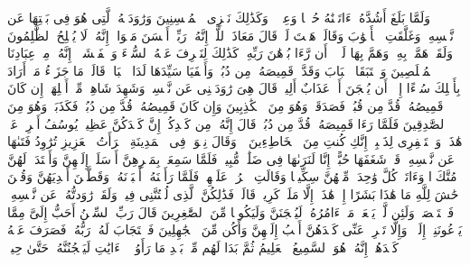 \stopbuffer%
\startbuffer[\q:12:22]
وَلَمَّا بَلَغَ أَشُدَّهُۥۤ ءَاتَیۡنَٰهُ حُكۡمࣰا وَعِلۡمࣰاۚ وَكَذَٰلِكَ نَجۡزِی ٱلۡمُحۡسِنِینَ%
\stopbuffer%
\startbuffer[\q:12:23]
وَرَٰوَدَتۡهُ ٱلَّتِی هُوَ فِی بَیۡتِهَا عَن نَّفۡسِهِۦ وَغَلَّقَتِ ٱلۡأَبۡوَٰبَ وَقَالَتۡ هَیۡتَ لَكَۚ قَالَ مَعَاذَ ٱللَّهِۖ إِنَّهُۥ رَبِّیۤ أَحۡسَنَ مَثۡوَایَۖ إِنَّهُۥ لَا یُفۡلِحُ ٱلظَّٰلِمُونَ%
\stopbuffer%
\startbuffer[\q:12:24]
وَلَقَدۡ هَمَّتۡ بِهِۦۖ وَهَمَّ بِهَا لَوۡلَاۤ أَن رَّءَا بُرۡهَٰنَ رَبِّهِۦۚ كَذَٰلِكَ لِنَصۡرِفَ عَنۡهُ ٱلسُّوۤءَ وَٱلۡفَحۡشَاۤءَۚ إِنَّهُۥ مِنۡ عِبَادِنَا ٱلۡمُخۡلَصِینَ%
\stopbuffer%
\startbuffer[\q:12:25]
وَٱسۡتَبَقَا ٱلۡبَابَ وَقَدَّتۡ قَمِیصَهُۥ مِن دُبُرࣲ وَأَلۡفَیَا سَیِّدَهَا لَدَا ٱلۡبَابِۚ قَالَتۡ مَا جَزَاۤءُ مَنۡ أَرَادَ بِأَهۡلِكَ سُوۤءًا إِلَّاۤ أَن یُسۡجَنَ أَوۡ عَذَابٌ أَلِیمࣱ%
\stopbuffer%
\startbuffer[\q:12:26]
قَالَ هِیَ رَٰوَدَتۡنِی عَن نَّفۡسِیۚ وَشَهِدَ شَاهِدࣱ مِّنۡ أَهۡلِهَاۤ إِن كَانَ قَمِیصُهُۥ قُدَّ مِن قُبُلࣲ فَصَدَقَتۡ وَهُوَ مِنَ ٱلۡكَٰذِبِینَ%
\stopbuffer%
\startbuffer[\q:12:27]
وَإِن كَانَ قَمِیصُهُۥ قُدَّ مِن دُبُرࣲ فَكَذَبَتۡ وَهُوَ مِنَ ٱلصَّٰدِقِینَ%
\stopbuffer%
\startbuffer[\q:12:28]
فَلَمَّا رَءَا قَمِیصَهُۥ قُدَّ مِن دُبُرࣲ قَالَ إِنَّهُۥ مِن كَیۡدِكُنَّۖ إِنَّ كَیۡدَكُنَّ عَظِیمࣱ%
\stopbuffer%
\startbuffer[\q:12:29]
یُوسُفُ أَعۡرِضۡ عَنۡ هَٰذَاۚ وَٱسۡتَغۡفِرِی لِذَنۢبِكِۖ إِنَّكِ كُنتِ مِنَ ٱلۡخَاطِءِینَ%
\stopbuffer%
\startbuffer[\q:12:30]
۞ وَقَالَ نِسۡوَةࣱ فِی ٱلۡمَدِینَةِ ٱمۡرَأَتُ ٱلۡعَزِیزِ تُرَٰوِدُ فَتَىٰهَا عَن نَّفۡسِهِۦۖ قَدۡ شَغَفَهَا حُبًّاۖ إِنَّا لَنَرَىٰهَا فِی ضَلَٰلࣲ مُّبِینࣲ%
\stopbuffer%
\startbuffer[\q:12:31]
فَلَمَّا سَمِعَتۡ بِمَكۡرِهِنَّ أَرۡسَلَتۡ إِلَیۡهِنَّ وَأَعۡتَدَتۡ لَهُنَّ مُتَّكَءࣰا وَءَاتَتۡ كُلَّ وَٰحِدَةࣲ مِّنۡهُنَّ سِكِّینࣰا وَقَالَتِ ٱخۡرُجۡ عَلَیۡهِنَّۖ فَلَمَّا رَأَیۡنَهُۥۤ أَكۡبَرۡنَهُۥ وَقَطَّعۡنَ أَیۡدِیَهُنَّ وَقُلۡنَ حَٰشَ لِلَّهِ مَا هَٰذَا بَشَرًا إِنۡ هَٰذَاۤ إِلَّا مَلَكࣱ كَرِیمࣱ%
\stopbuffer%
\startbuffer[\q:12:32]
قَالَتۡ فَذَٰلِكُنَّ ٱلَّذِی لُمۡتُنَّنِی فِیهِۖ وَلَقَدۡ رَٰوَدتُّهُۥ عَن نَّفۡسِهِۦ فَٱسۡتَعۡصَمَۖ وَلَئِن لَّمۡ یَفۡعَلۡ مَاۤ ءَامُرُهُۥ لَیُسۡجَنَنَّ وَلَیَكُونࣰا مِّنَ ٱلصَّٰغِرِینَ%
\stopbuffer%
\startbuffer[\q:12:33]
قَالَ رَبِّ ٱلسِّجۡنُ أَحَبُّ إِلَیَّ مِمَّا یَدۡعُونَنِیۤ إِلَیۡهِۖ وَإِلَّا تَصۡرِفۡ عَنِّی كَیۡدَهُنَّ أَصۡبُ إِلَیۡهِنَّ وَأَكُن مِّنَ ٱلۡجَٰهِلِینَ%
\stopbuffer%
\startbuffer[\q:12:34]
فَٱسۡتَجَابَ لَهُۥ رَبُّهُۥ فَصَرَفَ عَنۡهُ كَیۡدَهُنَّۚ إِنَّهُۥ هُوَ ٱلسَّمِیعُ ٱلۡعَلِیمُ%
\stopbuffer%
\startbuffer[\q:12:35]
ثُمَّ بَدَا لَهُم مِّنۢ بَعۡدِ مَا رَأَوُا۟ ٱلۡءَایَٰتِ لَیَسۡجُنُنَّهُۥ حَتَّىٰ حِینࣲ%
\stopbuffer%
\startbuffer[\q:12:36]
